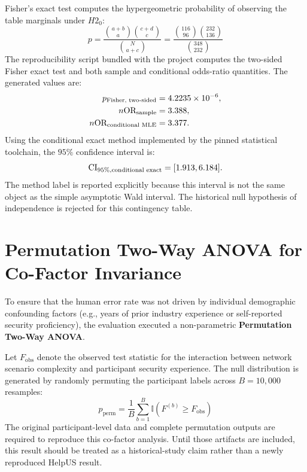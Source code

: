 Fisher's exact test computes the hypergeometric probability of observing the table marginals under $H2_0$:
\begin{equation}
    p = \frac{\binom{a+b}{a} \binom{c+d}{c}}{\binom{N}{a+c}} = \frac{\binom{116}{96} \binom{232}{136}}{\binom{348}{232}}
\end{equation}
The reproducibility script bundled with the project computes the two-sided Fisher exact test and both sample and conditional odds-ratio quantities. The generated values are:
\begin{align}
    p_{\text{Fisher, two-sided}} &= 4.2235 \times 10^{-6}, \\n    \text{OR}_{\text{sample}} &= 3.388, \\n    \text{OR}_{\text{conditional MLE}} &= 3.377.
\end{align}
Using the conditional exact method implemented by the pinned statistical toolchain, the $95\%$ confidence interval is:
\begin{equation}
    \text{CI}_{95\%,\text{conditional exact}} = [1.913, 6.184].
\end{equation}
The method label is reported explicitly because this interval is not the same object as the simple asymptotic Wald interval. The historical null hypothesis of independence is rejected for this contingency table.

\section{Permutation Two-Way ANOVA for Co-Factor Invariance}
\label{sec:permutation_anova}
To ensure that the human error rate was not driven by individual demographic confounding factors (e.g., years of prior industry experience or self-reported security proficiency), the evaluation executed a non-parametric \textbf{Permutation Two-Way ANOVA}.

Let $F_{\text{obs}}$ denote the observed test statistic for the interaction between network scenario complexity and participant security experience. The null distribution is generated by randomly permuting the participant labels across $B = 10,000$ resamples:
\begin{equation}
    p_{\text{perm}} = \frac{1}{B} \sum_{b=1}^{B} \mathbb{I}\left( F^{(b)} \ge F_{\text{obs}} \right)
\end{equation}
The original participant-level data and complete permutation outputs are required to reproduce this co-factor analysis. Until those artifacts are included, this result should be treated as a historical-study claim rather than a newly reproduced HelpUS result.


